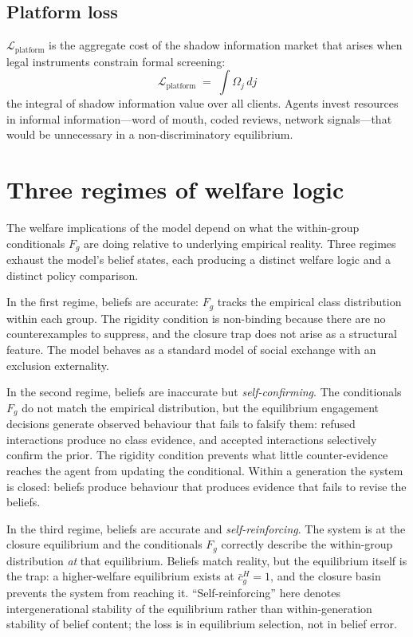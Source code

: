 \documentclass[12pt,a4paper]{article}
\theoremstyle{definition}
\numberwithin{proposition}{section}
\begin{document}
\subsection*{Platform loss}
$\mathcal{L}_{\text{platform}}$ is the aggregate cost of the shadow
information market that arises when legal instruments constrain
formal screening:
\begin{equation}
  \mathcal{L}_{\text{platform}} \;=\; \int \Omega_j \, dj
  \label{eq:L-platform}
\end{equation}
the integral of shadow information value over all clients. Agents
invest resources in informal information---word of mouth, coded
reviews, network signals---that would be unnecessary in a
non-discriminatory equilibrium.

\section{Three regimes of welfare logic}
\label{sec:welfare-cases}

The welfare implications of the model depend on what the within-group
conditionals $F_g$ are doing relative to underlying empirical reality.
Three regimes exhaust the model's belief states, each producing a
distinct welfare logic and a distinct policy comparison.

In the first regime, beliefs are accurate: $F_g$ tracks the empirical
class distribution within each group. The rigidity condition is
non-binding because there are no counterexamples to suppress, and
the closure trap does not arise as a structural feature. The model
behaves as a standard model of social exchange with an exclusion
externality.

In the second regime, beliefs are inaccurate but \emph{self-confirming}.
The conditionals $F_g$ do not match the empirical distribution, but
the equilibrium engagement decisions generate observed behaviour
that fails to falsify them: refused interactions produce no class
evidence, and accepted interactions selectively confirm the prior.
The rigidity condition prevents what little counter-evidence reaches
the agent from updating the conditional. Within a generation the
system is closed: beliefs produce behaviour that produces evidence
that fails to revise the beliefs.

In the third regime, beliefs are accurate and \emph{self-reinforcing}.
The system is at the closure equilibrium and the conditionals $F_g$
correctly describe the within-group distribution \emph{at} that
equilibrium. Beliefs match reality, but the equilibrium itself is
the trap: a higher-welfare equilibrium exists at $\bar{c}_g^H = 1$,
and the closure basin prevents the system from reaching it.
``Self-reinforcing'' here denotes intergenerational stability of the
equilibrium rather than within-generation stability of belief content;
the loss is in equilibrium selection, not in belief error.
\end{document}
